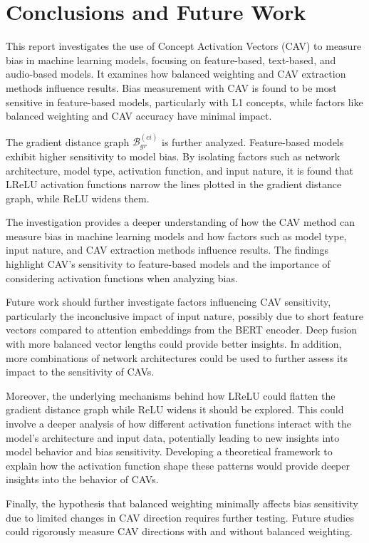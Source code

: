 \chapter{Conclusions and Future Work} \label{chap:conclusions}

This report investigates the use of Concept Activation Vectors (CAV) to measure bias in machine learning models, focusing on feature-based, text-based, and audio-based models. It examines how balanced weighting and CAV extraction methods influence results. Bias measurement with CAV is found to be most sensitive in feature-based models, particularly with L1 concepts, while factors like balanced weighting and CAV accuracy have minimal impact.

The gradient distance graph $\mathcal{B}^{(ci)}_{gr}$ is further analyzed. Feature-based models exhibit higher sensitivity to model bias. By isolating factors such as network architecture, model type, activation function, and input nature, it is found that LReLU activation functions narrow the lines plotted in the gradient distance graph, while ReLU widens them.

The investigation provides a deeper understanding of how the CAV method can measure bias in machine learning models and how factors such as model type, input nature, and CAV extraction methods influence results. The findings highlight CAV's sensitivity to feature-based models and the importance of considering activation functions when analyzing bias.

Future work should further investigate factors influencing CAV sensitivity, particularly the inconclusive impact of input nature, possibly due to short feature vectors compared to attention embeddings from the BERT encoder. Deep fusion with more balanced vector lengths could provide better insights. In addition, more combinations of network architectures could be used to further assess its impact to the sensitivity of CAVs.

Moreover, the underlying mechanisms behind how LReLU could flatten the gradient distance graph while ReLU widens it should be explored. This could involve a deeper analysis of how different activation functions interact with the model's architecture and input data, potentially leading to new insights into model behavior and bias sensitivity. Developing a theoretical framework to explain how the activation function shape these patterns would provide deeper insights into the behavior of CAVs.

Finally, the hypothesis that balanced weighting minimally affects bias sensitivity due to limited changes in CAV direction requires further testing. Future studies could rigorously measure CAV directions with and without balanced weighting.
